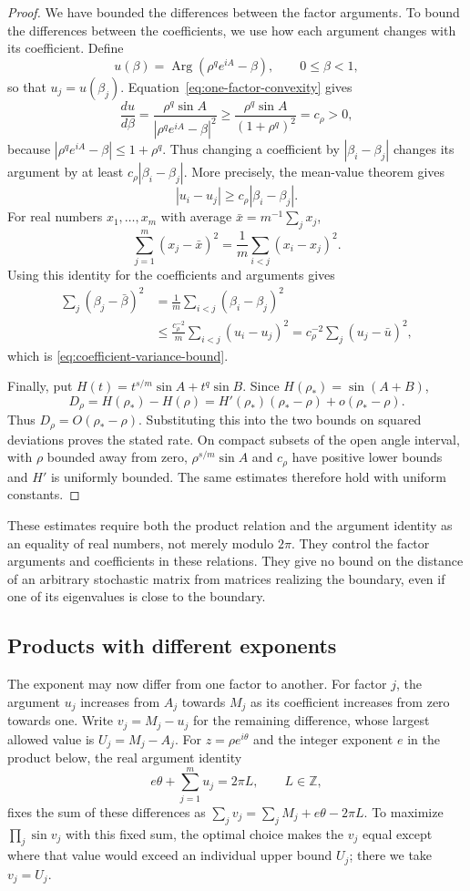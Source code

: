\documentclass[11pt,a4paper]{article}
\theoremstyle{definition}
\theoremstyle{remark}
\numberwithin{equation}{section}
\begin{document}
\begin{proof}
We have bounded the differences between the factor arguments. To bound the differences between the coefficients, we use how each argument changes with its coefficient. Define
\[
 u(\beta)=\operatorname{Arg}(\rho^qe^{iA}-\beta),\qquad0\le\beta<1,
\]
so that $u_j=u(\beta_j)$. Equation~\eqref{eq:one-factor-convexity} gives
\[
 \frac{du}{d\beta}
 =\frac{\rho^q\sin A}{|\rho^qe^{iA}-\beta|^2}
 \ge\frac{\rho^q\sin A}{(1+\rho^q)^2}=c_\rho>0,
\]
because $|\rho^qe^{iA}-\beta|\le1+\rho^q$. Thus changing a coefficient by $|\beta_i-\beta_j|$ changes its argument by at least $c_\rho|\beta_i-\beta_j|$. More precisely, the mean-value theorem gives
\[
 |u_i-u_j|\ge c_\rho|\beta_i-\beta_j|.
\]
For real numbers $x_1,\ldots,x_m$ with average $\bar x=m^{-1}\sum_jx_j$,
\[
 \sum_{j=1}^m(x_j-\bar x)^2
 =\frac1m\sum_{i<j}(x_i-x_j)^2.
\]
Using this identity for the coefficients and arguments gives
\[
 \begin{aligned}
 \sum_j(\beta_j-\bar\beta)^2
 &=\frac1m\sum_{i<j}(\beta_i-\beta_j)^2\\
 &\le\frac{c_\rho^{-2}}m\sum_{i<j}(u_i-u_j)^2
 =c_\rho^{-2}\sum_j(u_j-\bar u)^2,
 \end{aligned}
\]
which is \eqref{eq:coefficient-variance-bound}.

Finally, put $H(t)=t^{s/m}\sin A+t^q\sin B$. Since $H(\rho_*)=\sin(A+B)$,
\[
 D_\rho=H(\rho_*)-H(\rho)
 =H'(\rho_*)(\rho_*-\rho)+o(\rho_*-\rho).
\]
Thus $D_\rho=O(\rho_*-\rho)$. Substituting this into the two bounds on squared deviations proves the stated rate. On compact subsets of the open angle interval, with $\rho$ bounded away from zero, $\rho^{s/m}\sin A$ and $c_\rho$ have positive lower bounds and $H'$ is uniformly bounded. The same estimates therefore hold with uniform constants.
\end{proof}
These estimates require both the product relation and the argument identity as an equality of real numbers, not merely modulo $2\pi$. They control the factor arguments and coefficients in these relations. They give no bound on the distance of an arbitrary stochastic matrix from matrices realizing the boundary, even if one of its eigenvalues is close to the boundary.

\subsection{Products with different exponents}

The exponent may now differ from one factor to another. For factor $j$, the argument $u_j$ increases from $A_j$ towards $M_j$ as its coefficient increases from zero towards one. Write $v_j=M_j-u_j$ for the remaining difference, whose largest allowed value is $U_j=M_j-A_j$. For $z=\rho e^{i\theta}$ and the integer exponent $e$ in the product below, the real argument identity
\[
 e\theta+\sum_{j=1}^m u_j=2\pi L,\qquad L\in\mathbb Z,
\]
fixes the sum of these differences as $\sum_jv_j=\sum_jM_j+e\theta-2\pi L$. To maximize $\prod_j\sin v_j$ with this fixed sum, the optimal choice makes the $v_j$ equal except where that value would exceed an individual upper bound $U_j$; there we take $v_j=U_j$.
\end{document}
